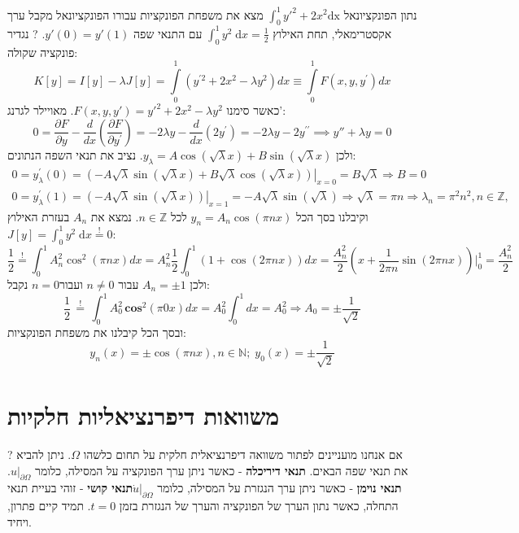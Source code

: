 \documentclass{tstextbook}
\begin{document}
נתון הפונקציונאל \(\int_{0}^1 y'^2+2x^2\mathrm{dx}\) מצא את משפחת הפונקציות עבורו הפונקציונאל מקבל ערך אקסטרימאלי, תחת האילוץ \(\int_{0}^1 y^2\;\mathrm{d}x=\frac{1}{2}\) עם התנאי שפה \(y'(0)=y'(1)\). 
?
נגדיר פונקציה שקולה:
$$K\left[y\right]=I\left[y\right]-\lambda J\left[y\right]=\int\limits_{0}^{1}\left(y^{\prime2}+2x^{2}-\lambda y^{2}\right)d x\equiv\int\limits_{0}^{1}F\left(x,y,y^{\prime}\right)d x$$
כאשר סימנו \(F(x,y,y')=y'^2+2x^2-\lambda y^2\). מאויילר לגרנג':
$$0=\frac{\partial F}{\partial y}-\frac{d}{d x}\left(\frac{\partial F}{\partial y^{\prime}}\right)=-2\lambda y-\frac{d}{d x}\left(2y^{\prime}\right)=-2\lambda y-2y^{\prime\prime}\implies y''+\lambda y = 0$$
ולכן \(y_{\lambda}=A\cos\left( \sqrt{ \lambda }x \right)+B\sin\left( \sqrt{ \lambda  }x \right)\). נציב את תנאי השפה הנתונים:
\begin{gather*}{0=\!\!y_{\lambda}^{\prime}\left(0\right)=\left.\left(-A{\sqrt{\lambda}}\sin\left({\sqrt{\lambda}}x\right)+B{\sqrt{\lambda}}\cos\left({\sqrt{\lambda}}x\right)\right)\right|_{x=0}=B{\sqrt{\lambda}}\Rightarrow B=0}\\ {0=\!\!y_{\lambda}^{\prime}\left(1\right)=\left.\left(-A{\sqrt{\lambda}}\sin\left({\sqrt{\lambda}}x\right)\right)\right|_{x=1}=-A{\sqrt{\lambda}}\sin\left({\sqrt{\lambda}}\right)\Rightarrow{\sqrt{\lambda}}=\pi n\Rightarrow\lambda_{n}=\pi^{2}n^{2},n\in\mathbb{Z},}\end{gather*}
וקיבלנו בסך הכל \(y_{n}=A_{n}\cos\left( \pi nx \right)\) לכל \(n \in \mathbb{Z}\). נמצא את \(A_{n}\) בעזרת האילוץ \(J[y]=\int_{0}^1y^2\;\mathrm{d}x\overset{!}{=}0\):
$${\frac{1}{2}}\overset{!}{=} \int_{0}^{1}A_{n}^{2}\cos^{2}\left(\pi n x\right)d x=A_{n}^{2}{\frac{1}{2}}\int_{0}^{1}\left(1+\cos\left(2\pi n x\right)\right)d x={\frac{A_{n}^{2}}{2}}\left(x+{\frac{1}{2\pi n}}\!\!\sin\!\left(2\pi n x\!\right)\right)\!\Bigg|_{0}^{1}= \frac{A_{n}^2}{2}$$
ולכן \(A_{n}=\pm 1\) עבור \(n \neq 0\) ועבור\(n=0\) נקבל:
$${\frac{1}{2}}\,{\stackrel{!}{=}}\,\int_{0}^{1}A_{0}^{2}\,\mathbf{cos}^{2}\left(\pi0x\right)d x=A_{0}^{2}\int_{0}^{1}d x=A_{0}^{2}\Rightarrow A_{0}=\pm{\frac{1}{\sqrt{2}}}$$
ובסך הכל קיבלנו את משפחת הפונקציות:
$$y_{n}\left(x\right)=\pm\cos\left(\pi n x\right),n\in\mathbb{N};\;y_{0}\left(x\right)=\pm{\frac{1}{\sqrt{2}}}$$

\section{משוואות דיפרנציאליות חלקיות}

?
אם אנחנו מועניינים לפתור משוואה דיפרנציאלית חלקית על תחום כלשהו \(\Omega\). ניתן להביא את תנאי שפה הבאים.
\textbf{תנאי דיריכלה} - כאשר ניתן ערך הפונקציה על המסילה, כלומר \(u|_{\partial\Omega}\).
\textbf{תנאי נוימן} - כאשר ניתן ערך הנגזרת על המסילה, כלומר \(\dot{u}|_{\partial\Omega}\)\textbf{תנאי קושי} - זוהי בעיית תנאי התחלה, כאשר נתון הערך של הפונקציה והערך של הנגזרת בזמן \(t=0\). תמיד קיים פתרון, ויחיד.
\end{document}
